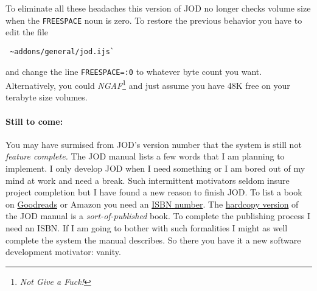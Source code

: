 To eliminate all these headaches this version of JOD no longer checks
volume size when the \texttt{FREESPACE} noun is zero. To restore the
previous behavior you have to edit the file

\begin{verbatim}
 ~addons/general/jod.ijs`
\end{verbatim}

\noindent and change the line \texttt{FREESPACE=:0} to whatever byte count you
want. Alternatively, you could
\emph{NGAF}\footnote{\emph{Not Give a Fuck!}
} and just assume you have 48K free on your terabyte size volumes.

\paragraph{Still to come:}

You may have surmised from JOD's version number that the system is still
not \emph{feature complete.} The JOD manual lists a few words that I am
planning to implement. I only develop JOD when I need something or I am
bored out of my mind at work and need a break. Such intermittent
motivators seldom insure project completion but I have found a new
reason to finish JOD. To list a book on
\href{http://www.goodreads.com/bakerjd99}{Goodreads} or Amazon you need
an \href{https://www.isbn-international.org/}{ISBN number}. The
\href{http://www.lulu.com/spotlight/bakerjd99}{hardcopy version} of the
JOD manual is a \emph{sort-of-published} book. To complete the
publishing process I need an ISBN. If I am going to bother with such
formalities I might as well complete the system the manual describes. So
there you have it a new software development motivator: vanity.


%
%
%



%